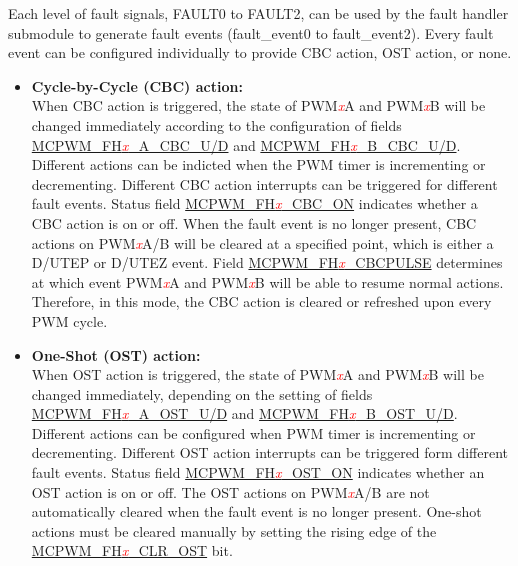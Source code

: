 \documentclass[main\_\_EN.tex]{subfiles}
\begin{document}
Each level of fault signals, FAULT0 to FAULT2, can be used by the fault handler submodule to generate fault events (fault\_event0 to fault\_event2). Every fault event can be configured individually to provide CBC action, OST action, or none.

\begin{itemize}
    \item {\bfseries Cycle-by-Cycle (CBC) action:}\\
    When CBC action is triggered, the state of PWM\textcolor{red}{\it{x}}A and PWM\textcolor{red}{\it{x}}B will be changed immediately according to the configuration of fields \hyperref[fielddesc:MCPWMFH0ACBCU]{MCPWM\_FH\textcolor{red}{\it{x}}\_A\_CBC\_U/D} and \hyperref[fielddesc:MCPWMFH0BCBCU]{MCPWM\_FH\textcolor{red}{\it{x}}\_B\_CBC\_U/D}. Different actions can be indicted when the PWM timer is incrementing or decrementing. Different CBC action interrupts can be triggered for different fault events. Status field \hyperref[fielddesc:MCPWMFH0CBCON]{MCPWM\_FH\textcolor{red}{\it{x}}\_CBC\_ON} indicates whether a CBC action is on or off.
   When the fault event is no longer present, CBC actions on PWM\textcolor{red}{\it{x}}A/B will be cleared at a specified point, which is either a D/UTEP or D/UTEZ event. Field \hyperref[fielddesc:MCPWMFH0CBCPULSE]{MCPWM\_FH\textcolor{red}{\it{x}}\_CBCPULSE} determines at which event PWM\textcolor{red}{\it{x}}A and PWM\textcolor{red}{\it{x}}B will be able to resume normal actions. Therefore, in this mode, the CBC action is cleared or refreshed upon every PWM cycle.
    \item {\bfseries One-Shot (OST) action:}\\
	When OST action is triggered, the state of PWM\textcolor{red}{\it{x}}A and PWM\textcolor{red}{\it{x}}B will be changed immediately, depending on the setting of fields \hyperref[fielddesc:MCPWMFH0AOSTU]{MCPWM\_FH\textcolor{red}{\it{x}}\_A\_OST\_U/D} and \hyperref[fielddesc:MCPWMFH0BOSTU]{MCPWM\_FH\textcolor{red}{\it{x}}\_B\_OST\_U/D}. Different actions can be configured when PWM timer is incrementing or decrementing. Different OST action interrupts can be triggered form different fault events. Status field \hyperref[fielddesc:MCPWMFH0OSTON]{MCPWM\_FH\textcolor{red}{\it{x}}\_OST\_ON} indicates whether an OST action is on or off.
    The OST actions on PWM\textcolor{red}{\it{x}}A/B are not automatically cleared when the fault event is no longer present. One-shot actions must be cleared manually by setting the rising edge of the \hyperref[fielddesc:MCPWMFH0CLROST]{MCPWM\_FH\textcolor{red}{\it{x}}\_CLR\_OST} bit.
\end{itemize}
\end{document}
